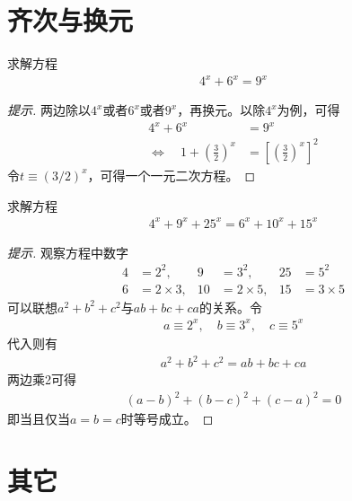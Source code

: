 \section{齐次与换元}
\label{sec:homogeneous-and-substitution}

\begin{example}[美国竞赛题]
  求解方程
  \begin{align*}
    4^x + 6^x = 9^x
  \end{align*}
\end{example}
\begin{proof}[提示]
  两边除以$4^x$或者$6^x$或者$9^x$，再换元。以除$4^x$为例，可得
  \begin{align*}
                               4^x + 6^x &= 9^x\\
    \iff\quad 1 + \left(\frac32\right)^x &= \left[\left(\frac32\right)^x\right]^2
  \end{align*}
  令$t\equiv (3/2)^x$，可得一个一元二次方程。
\end{proof}


\begin{example}[安徽竞赛题]
  求解方程
  \begin{align*}
    4^x + 9^x + 25^x = 6^x + 10^x + 15^x
  \end{align*}
\end{example}
\begin{proof}[提示]
  观察方程中数字
  \begin{align*}
    4 &= 2^2,       & 9 &= 3^2,        & 25 &= 5^2\\
    6 &= 2\times 3, & 10&= 2\times  5, & 15 &= 3\times 5
  \end{align*}
  可以联想$a^2+b^2+c^2$与$ab+bc+ca$的关系。令
  \begin{align*}
    a\equiv 2^x, \quad b\equiv 3^x, \quad c\equiv 5^x
  \end{align*}
  代入则有
  \begin{align*}
    a^2 + b^2 + c^2 = ab + bc + ca
  \end{align*}
  两边乘2可得
  \begin{align*}
    (a-b)^2 + (b-c)^2 + (c-a)^2 = 0
  \end{align*}
  即当且仅当$a=b=c$时等号成立。
\end{proof}


\section{其它}
\label{sec:misc-method}

